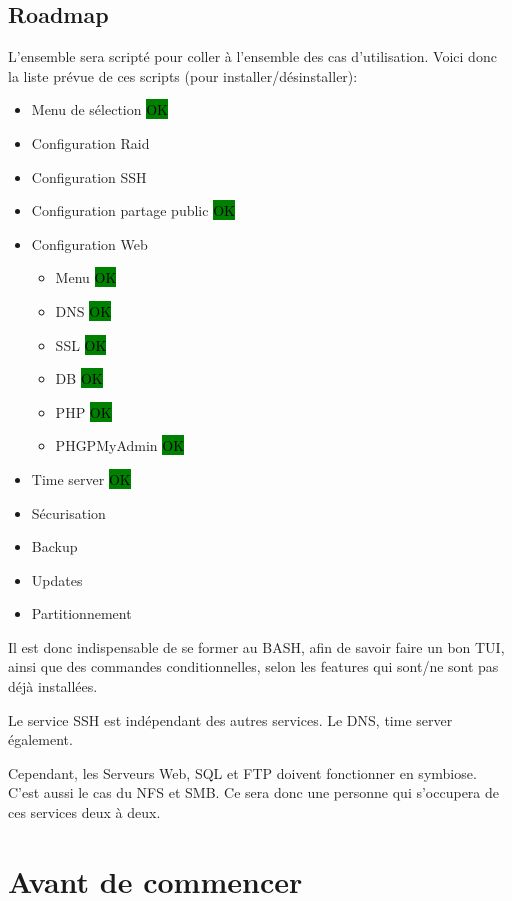 \documentclass{article}
\begin{document}
\newpage	
	
\subsection{Roadmap}
L'ensemble sera scripté pour coller à l'ensemble des cas d'utilisation. Voici donc la liste prévue de ces scripts (pour installer/désinstaller):
\begin{itemize}
\item Menu de sélection											\colorbox{green}{\textcolor{black}{OK}}
\item Configuration Raid
\item Configuration SSH 								
\item Configuration partage public 
\colorbox{green}{\textcolor{black}{OK}}							
\item Configuration Web 
\begin{itemize}
\item Menu \colorbox{green}{\textcolor{black}{OK}}							
\item DNS \colorbox{green}{\textcolor{black}{OK}}							
\item SSL \colorbox{green}{\textcolor{black}{OK}}							
\item DB \colorbox{green}{\textcolor{black}{OK}}							
\item PHP \colorbox{green}{\textcolor{black}{OK}}							
\item PHGPMyAdmin \colorbox{green}{\textcolor{black}{OK}}			
\end{itemize}
\item Time server \colorbox{green}{\textcolor{black}{OK}}
\item Sécurisation
\item Backup
\item Updates
\item Partitionnement
		\end{itemize}
		Il est donc indispensable de se former au BASH, afin de savoir faire un bon TUI, ainsi que des commandes conditionnelles, selon les features qui sont/ne sont pas déjà installées.
		
		Le service SSH est indépendant des autres services. Le DNS, time server également.
		
		Cependant, les Serveurs Web, SQL et FTP doivent fonctionner en symbiose. C'est aussi le cas du NFS et SMB. Ce sera donc une personne qui s'occupera de ces services deux à deux.
	
\pagebreak

\section{Avant de commencer}
	
\end{document}
